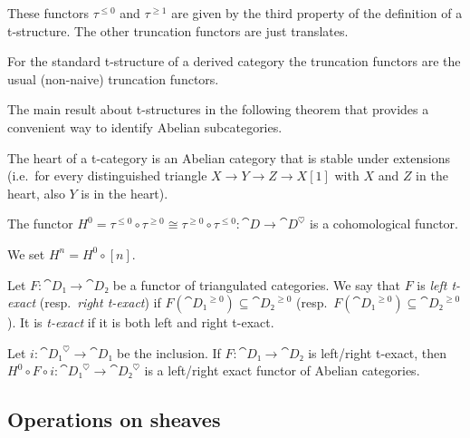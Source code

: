 \documentclass[english]{short-notes}
\begin{document}
These functors $τ^{≤0}$ and $τ^{≥1}$ are given by the third property of the definition of a t-structure. 
The other truncation functors are just translates.

\begin{Ex}
    For the standard t-structure of a derived category the truncation functors are the usual (non-naive) truncation functors.
\end{Ex}

The main result about t-structures in the following theorem that provides a convenient way to identify Abelian subcategories.

\begin{Thm}
    The heart of a t-category is an Abelian category that is stable under extensions (i.e.\ for every distinguished triangle $X → Y → Z → X[1]$ with $X$ and $Z$ in the heart, also $Y$ is in the heart).
\end{Thm}

\begin{Prop}
    The functor $H^0 = τ^{≤0} ∘ τ^{≥0} \cong τ^{≥0} ∘ τ^{≤0}\colon \cat D → \cat D^{\heartsuit}$ is a cohomological functor.
\end{Prop}

We set $H^n = H^0 ∘ [n]$.

\begin{Def}
    Let $F\colon \cat{D₁} → \cat{D₂}$ be a functor of triangulated categories.
    We say that $F$ is \emph{left t-exact} (resp.\ \emph{right t-exact}) if $F(\cat{D₁}^{≥0}) ⊆ \cat{D₂}^{≥0}$ (resp.\ $F(\cat{D₁}^{≥0}) ⊆ \cat{D₂}^{≥0}$).
    It is \emph{t-exact} if it is both left and right t-exact.
\end{Def}

\begin{Prop}
    Let $i\colon \cat{D₁}^\heartsuit → \cat{D₁}$ be the inclusion.
    If $F\colon \cat{D₁} → \cat{D₂}$ is left/right t-exact, then $H^0 ∘ F ∘ i\colon \cat{D₁}^\heartsuit → \cat{D₂}^\heartsuit$ is a left/right exact functor of Abelian categories.
\end{Prop}


\subsection{Operations on sheaves}
\end{document}
